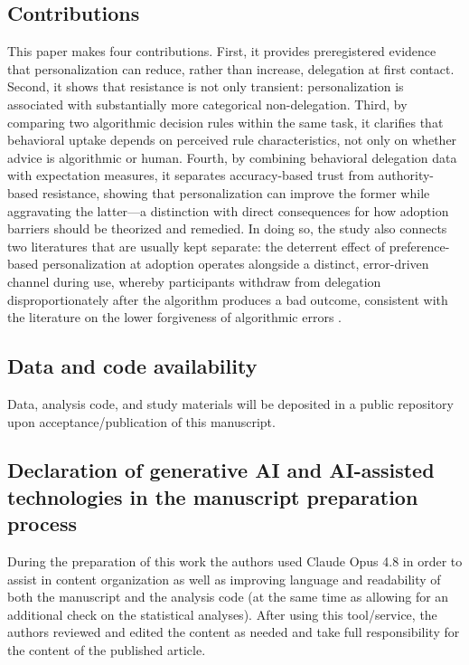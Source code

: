 \documentclass[a4paper, 12pt, fleqn]{article}
\theoremstyle{definition}
\newcommand{\inew}[1]{{\color{blue} #1\color{black}}}
\begin{document}
\subsection{Contributions}
This paper makes \inew{four} contributions. First, it provides preregistered evidence that personalization can reduce, rather than increase, delegation at first contact. Second, it shows that resistance is not only transient: personalization is associated with substantially more categorical non-delegation. Third, by comparing two algorithmic decision rules within the same task, it clarifies that behavioral uptake depends on perceived rule characteristics, not only on whether advice is algorithmic or human. \inew{Fourth, by combining behavioral delegation data with expectation measures, it separates accuracy-based trust from authority-based resistance, showing that personalization can improve the former while aggravating the latter---a distinction with direct consequences for how adoption barriers should be theorized and remedied.} In doing so, the study also connects two literatures that are usually kept separate: the deterrent effect of preference-based personalization at adoption operates alongside a distinct, error-driven channel during use, whereby participants withdraw from delegation disproportionately after the algorithm produces a bad outcome, consistent with the literature on the lower forgiveness of algorithmic errors \citep{Dietvorst2018,Renier2021}.

\subsection{Data and code availability}
Data, analysis code, and study materials will be deposited in a public repository upon acceptance/publication of this manuscript. 


\subsection{Declaration of generative AI and AI-assisted technologies in the manuscript preparation process}
During the preparation of this work the authors used Claude Opus 4.8 in order to assist in content organization as well as improving language and readability of both the manuscript and the analysis code (at the same time as allowing for an additional check on the statistical analyses). After using this tool/service, the authors reviewed and edited the content as needed and take full responsibility for the content of the published article.


\newpage
\thispagestyle{plain}
\addtolength{\topmargin}{-.5cm}
\addtolength{\textheight}{.8cm}



\end{document}
